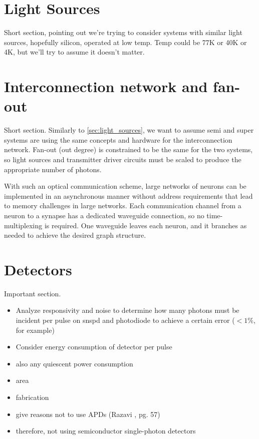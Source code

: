 \documentclass[onecolumn]{article}
\begin{document}
\section{\label{sec:light_sources}Light Sources}
Short section, pointing out we're trying to consider systems with similar light sources, hopefully silicon, operated at low temp. Temp could be 77K or 40K or 4K, but we'll try to assume it doesn't matter. 
	
\section{\label{sec:interconnection}Interconnection network and fan-out}
Short section. Similarly to \ref{sec:light_sources}, we want to assume semi and super systems are using the same concepts and hardware for the interconnection network. Fan-out (out degree) is constrained to be the same for the two systems, so light sources and transmitter driver circuits must be scaled to produce the appropriate number of photons.

With such an optical communication scheme, large networks of neurons can be implemented in an asynchronous manner without address requirements that lead to memory challenges in large networks. Each communication channel from a neuron to a synapse has a dedicated waveguide connection, so no time-multiplexing is required. One waveguide leaves each neuron, and it branches as needed to achieve the desired graph structure.

\section{\label{sec:detectors}Detectors}
Important section. 
\begin{itemize}
\item Analyze responsivity and noise to determine how many photons must be incident per pulse on snspd and photodiode to achieve a certain error ($<1\%$, for example)
\item Consider energy consumption of detector per pulse
\item also any quiescent power consumption
\item area
\item fabrication
\item give reasons not to use APDs (Razavi \cite{ra2012}, pg. 57)
\item therefore, not using semiconductor single-photon detectors
\end{itemize}
\end{document}
